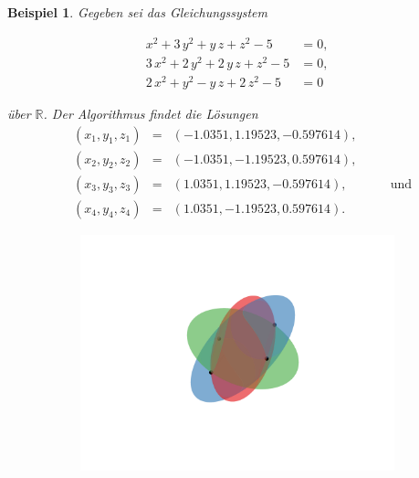 \documentclass[a4paper,oneside, 11pt, openany%
]{article}
\newcommand{\R}{{\mathbb R}}
\theoremstyle{custom}
\theoremstyle{custom}
\newtheorem{example}{Beispiel}[section]
\begin{document}
	\begin{example}
		Gegeben sei das Gleichungssystem
		
		\begin{equation*}\label{eqn:example5}
			\begin{alignedat}{-1}
				x^2+3\,y^2+y\,z+z^2-5&=0,\\
				 3\,x^2+2\,y^2+2\,y\,z+z^2-5&=0,\\
				2\,x^2+y^2-y\,z+2\,z^2-5&=0
			\end{alignedat}
		\end{equation*}
		
		über $\R$.
		Der Algorithmus findet die Lösungen
		\begin{equation*}
			\begin{alignedat}{5}
				&\left( x_{1},y_{1},z_{1}\right) &=& \left(-1.0351,1.19523,-0.597614 \right),&& \\
				&\left( x_{2},y_{2},z_{2}\right) &=& \left(-1.0351,-1.19523,0.597614\right),&& \\
				&\left( x_{3},y_{3},z_{3}\right) &=& \left(1.0351,1.19523,-0.597614 \right),&& \quad\text{und} \\
				&\left( x_{4},y_{4},z_{4}\right) &=& \left(1.0351,-1.19523,0.597614 \right).&&
			\end{alignedat}
		\end{equation*}
	\end{example}
		\begin{figure}[H]
			\centering
			\begin{subfigure}[b]{0.8\textwidth}
				\includegraphics[width=\textwidth]{"images/e3q3_example3.png"}
			\end{subfigure}
		\end{figure}
\end{document}
